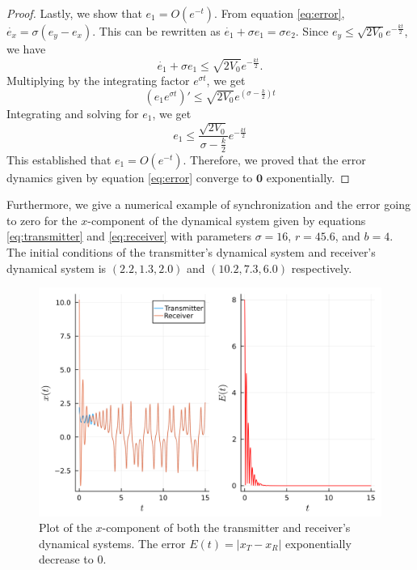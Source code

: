 \documentclass[12pt]{article}
\begin{document}
\begin{proof}
        Lastly, we show that $e_1 = O(e^{-t})$. From equation \ref{eq:error}, $\dot{e_x} = \sigma (e_y - e_x)$. This can be rewritten as $\dot{e_1} + \sigma e_1 = \sigma e_2$. Since $e_y \leq \sqrt{2V_0} e^{-\frac{kt}{2}}$, we have 
        \begin{equation*} 
          \dot{e_1} + \sigma e_1 \leq \sqrt{2V_0} e^{-\frac{kt}{2}}. 
        \end{equation*}
        Multiplying by the integrating factor $e^{\sigma t}$, we get 
        \begin{equation*} 
          (e_1 e^{\sigma t})' \leq \sqrt{2V_0} e^{\left( \sigma - \frac{k}{2} \right)t} 
        \end{equation*}
        Integrating and solving for $e_1$, we get 
        \begin{equation*} 
          e_1 \leq \frac{\sqrt{2V_0}}{\sigma - \frac{k}{2}} e^{-\frac{kt}{2}}
        \end{equation*}
        This established that $e_1 = O(e^{-t})$. Therefore, we proved that the error dynamics given by equation \ref{eq:error} converge to $\mathbf{0}$ exponentially. 
      \end{proof}
      Furthermore, we give a numerical example of synchronization and the error going to zero for the $x$-component of the dynamical system given by equations \ref{eq:transmitter} and \ref{eq:receiver} with parameters $\sigma = 16$, $r=45.6$, and $b = 4$. The initial conditions of the transmitter's dynamical system and receiver's dynamical system is $(2.2, 1.3, 2.0)$ and $(10.2, 7.3, 6.0)$ respectively. 
      \begin{figure}[H]
          \includegraphics[width=\linewidth]{figures/combined_plot.png}
          \centering
          \caption{Plot of the $x$-component of both the transmitter and receiver's dynamical systems. The error $E(t) = |x_T - x_R|$ exponentially decrease to $0$.}
      \end{figure}
\end{document}
